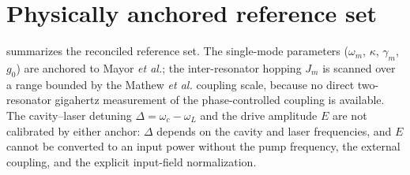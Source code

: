 \documentclass[Phys]{SciPost}
\begin{document}
\section{Physically anchored reference set}

 summarizes the reconciled reference set. The single-mode
parameters ($\omega_m$, $\kappa$, $\gamma_m$, $g_0$) are anchored to Mayor
\emph{et al.}; the inter-resonator hopping $J_m$ is scanned over a range bounded by the
Mathew \emph{et al.} coupling scale, because no direct two-resonator gigahertz
measurement of the phase-controlled coupling is available. The cavity--laser detuning
$\Delta=\omega_c-\omega_L$ and the drive amplitude $E$ are not calibrated by either
anchor: $\Delta$ depends on the cavity and laser frequencies, and $E$ cannot be
converted to an input power without the pump frequency, the external coupling, and the
explicit input-field normalization.

\begin{table}[h]
  \centering
  \caption{Physically anchored reference parameter set for the one-optical/two-mechanical
  optomechanical model of the main text. Normalized values are in units of the
  reference mechanical frequency $\omega_m=2\pi\times\qty{7.436}{\giga\hertz}$. The
  reference operating point used for the numerical validation of the main text is shown for
  comparison and is not a calibrated device.}
  \label{SI-tab:si-calibrated}
\end{table}
\end{document}

